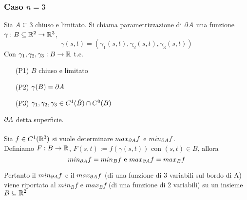 \subsubsection{Caso $n=3$}
  Sia $A \subseteq 3$ chiuso e limitato. Si chiama parametrizzazione di $\partial A$ una funzione
  $\gamma : B \subseteq \mathbb{R}^2 \to \mathbb{R}^3$, $$\gamma(s,t) = \left(\gamma_1(s,t), \gamma_2(s,t), \gamma_3(s,t)\right)$$
  Con $\gamma_1, \gamma_2, \gamma_3 : B \to \mathbb{R}$ t.c.
  \begin{itemize}
    \item[(P1)] $B$ chiuso e limitato
    \item[(P2)] $\gamma(B) = \partial A$
    \item[(P3)] $\gamma_1, \gamma_2, \gamma_3 \in C^1 (\mathring{B}) \cap C^{0}(B)$ 
  \end{itemize}
  $\partial A$ \ace detta superficie. \\\\
  Sia $f \in C^1(\mathbb{R}^3)$ si vuole determinare $max_{\partial A} f$ e $min_{\partial A} f$. \\
  Definiamo $F:B\to \mathbb{R}$, $F(s,t) := f(\gamma(s,t))$ con $(s,t)\in B$, allora
  $$min_{\partial A} f = min_{B} f \text{ e } max_{\partial A} f = max_{B} f$$
\begin{osservazione}
  Pertanto il $min_{\partial A} f$ e il $max_{\partial A} f$ (di una funzione di 3 variabili sul bordo di A) viene riportato 
  al $min_{B} f$ e $max_{B} f$ (di una funzione di 2 variabili) su un insieme $B\subseteq \mathbb{R}^2$
\end{osservazione}
